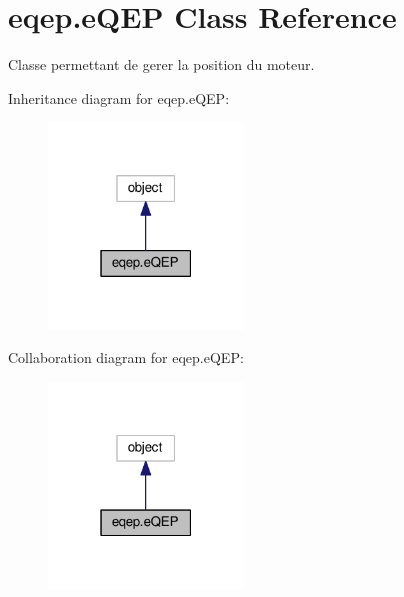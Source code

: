 \hypertarget{classeqep_1_1eQEP}{}\section{eqep.\+e\+Q\+EP Class Reference}
\label{classeqep_1_1eQEP}


Classe permettant de gerer la position du moteur.  




Inheritance diagram for eqep.\+e\+Q\+EP\+:\nopagebreak
\begin{figure}[H]
\begin{center}
\leavevmode
\includegraphics[width=147pt]{classeqep_1_1eQEP__inherit__graph}
\end{center}
\end{figure}


Collaboration diagram for eqep.\+e\+Q\+EP\+:\nopagebreak
\begin{figure}[H]
\begin{center}
\leavevmode
\includegraphics[width=147pt]{classeqep_1_1eQEP__coll__graph}
\end{center}
\end{figure}
